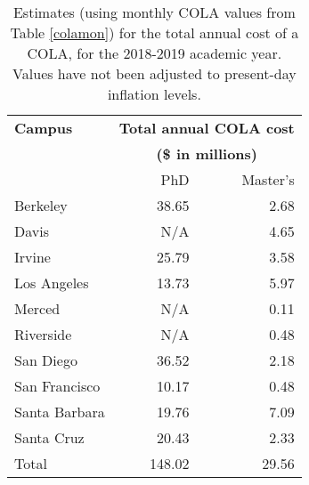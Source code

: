 \documentclass{article}
\begin{document}
\begin{table}[ht]
\centering
\begin{tabular}{@{}lrr@{}}
\toprule
\textbf{Campus} & \multicolumn{2}{c}{\textbf{Total annual COLA cost}} \\ 
	        & \multicolumn{2}{c}{\textbf{(\$ in millions)}} \\ \midrule
                & PhD                         & Master’s                   \\
Berkeley        & 38.65                   & 2.68                   \\
Davis           & N/A                    & 4.65                   \\
Irvine          & 25.79                    & 3.58                   \\
Los Angeles     & 13.73                    & 5.97                   \\
Merced          & N/A                      & 0.11                      \\
Riverside       & N/A                    & 0.48                    \\
San Diego       & 36.52                    & 2.18                   \\
San Francisco   & 10.17                    & 0.48                     \\
Santa Barbara   & 19.76                    & 7.09                   \\
Santa Cruz      & 20.43                    & 2.33                   \\
Total           & 148.02                   & 29.56                  \\ \bottomrule
\end{tabular}
\caption{Estimates (using monthly COLA values from Table \ref{colamon}) for the total annual cost of a COLA, for the 2018-2019 academic year. Values have not been adjusted to present-day inflation levels.}
\label{colaann}
\end{table}

\newpage
\end{document}
